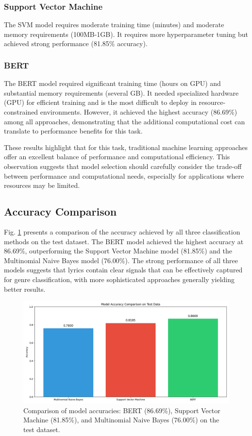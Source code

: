 \documentclass[conference]{IEEEtran}
\begin{document}
\subsubsection{Support Vector Machine}
The SVM model requires moderate training time (minutes) and moderate memory requirements (100MB-1GB). It requires more hyperparameter tuning but achieved strong performance (81.85\% accuracy).

\subsubsection{BERT}
The BERT model required significant training time (hours on GPU) and substantial memory requirements (several GB). It needed specialized hardware (GPU) for efficient training and is the most difficult to deploy in resource-constrained environments. However, it achieved the highest accuracy (86.69\%) among all approaches, demonstrating that the additional computational cost can translate to performance benefits for this task.

These results highlight that for this task, traditional machine learning approaches offer an excellent balance of performance and computational efficiency. This observation suggests that model selection should carefully consider the trade-off between performance and computational needs, especially for applications where resources may be limited.

\subsection{Accuracy Comparison}
Fig. \ref{fig:model_comparison_accuracy} presents a comparison of the accuracy achieved by all three classification methods on the test dataset. The BERT model achieved the highest accuracy at 86.69\%, outperforming the Support Vector Machine model (81.85\%) and the Multinomial Naive Bayes model (76.00\%). The strong performance of all three models suggests that lyrics contain clear signals that can be effectively captured for genre classification, with more sophisticated approaches generally yielding better results.

\begin{figure}[htbp]
\centerline{\includegraphics[width=0.9\columnwidth]{plots/model_comparison_accuracy.png}}
\caption{Comparison of model accuracies: BERT (86.69\%), Support Vector Machine (81.85\%), and Multinomial Naive Bayes (76.00\%) on the test dataset.}
\label{fig:model_comparison_accuracy}
\end{figure}
\end{document}
